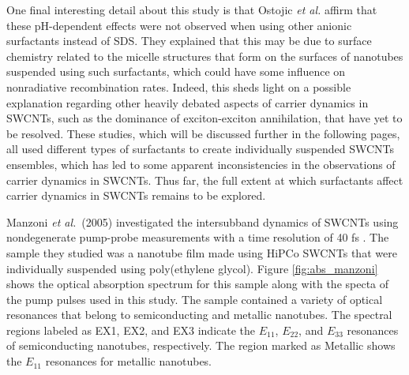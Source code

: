 One final interesting detail about this study is that Ostojic \textit{et al.} affirm that these pH-dependent effects were not observed when using other anionic surfactants instead of SDS. They explained that this may be due to surface chemistry related to the micelle structures that form on the surfaces of nanotubes suspended using such surfactants, which could have some influence on nonradiative recombination rates. Indeed, this sheds light on a possible explanation regarding other heavily debated aspects of carrier dynamics in SWCNTs, such as the dominance of exciton-exciton annihilation, that have yet to be resolved. These studies, which will be discussed further in the following pages, all used different types of surfactants to create individually suspended SWCNTs ensembles, which has led to some apparent inconsistencies in the observations of carrier dynamics in SWCNTs. Thus far, the full extent at which surfactants affect carrier dynamics in SWCNTs remains to be explored.

Manzoni \textit{et al.}\ (2005) investigated the intersubband dynamics of SWCNTs using nondegenerate pump-probe measurements with a time resolution of 40 fs \cite{manzoni2005intersubband}. The sample they studied was a nanotube film made using HiPCo SWCNTs that were individually suspended using poly(ethylene glycol). Figure \ref{fig:abs_manzoni} shows the optical absorption spectrum for this sample along with the specta of the pump pulses used in this study. The sample contained a variety of optical resonances that belong to semiconducting and metallic nanotubes. The spectral regions labeled as EX1, EX2, and EX3 indicate the $E_{11}$, $E_{22}$, and $E_{33}$ resonances of semiconducting nanotubes, respectively. The region marked as Metallic shows the $E_{11}$ resonances for metallic nanotubes.

